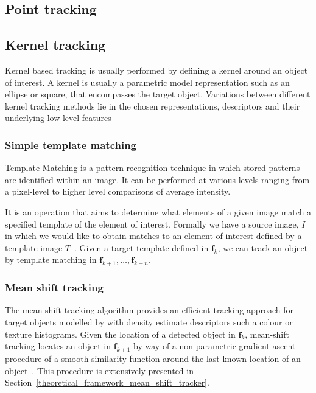 
\subsection{Point tracking}\label{literature_review_point}


\subsection{Kernel tracking}\label{literature_review_kernel}
Kernel based tracking is usually performed by defining a kernel around an object
of interest. A kernel is usually a parametric model representation such as an
ellipse or square, that encompasses the target object. 
Variations between different kernel tracking methods lie in the chosen representations,
descriptors and their underlying low-level features~\cite{Prajapati2015}

\subsubsection{Simple template matching}
Template Matching is a pattern recognition technique in which stored patterns 
are identified within an image. It can be performed at various levels ranging
from a pixel-level to higher level comparisons of average intensity.

It is an operation that aims to determine what elements of a given image match a
specified template of the element of interest. Formally we have a source image,
$I$ in which we would like to obtain matches to an element of interest defined
by a template image $T$~\cite{Brunelli}. 
Given a target template defined in $\mathbf{f}_k$, we can track an object by 
template matching in $\mathbf{f}_{k+1},\ldots,\mathbf{f}_{k+n}$.

\subsubsection{Mean shift tracking}\label{literature_review_mean_shift}
The mean-shift tracking algorithm provides an efficient tracking approach for
target objects modelled by with density estimate descriptors such a colour or
texture histograms. 
Given the location of a detected object in $\mathbf{f}_k$, mean-shift tracking
locates an object in $\mathbf{f}_{k+1}$ by way of a
non parametric gradient ascent procedure of a smooth similarity function around
the last known location of an object~\cite{Comaniciu2003}. This procedure is
extensively presented in Section~\ref{theoretical_framework_mean_shift_tracker}.


